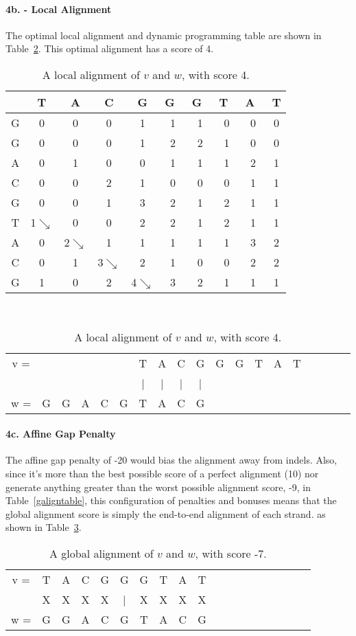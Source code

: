 \documentclass[12pt]{amsart}
\begin{document}
\paragraph{4b. - Local Alignment} The optimal local alignment and dynamic programming table are shown in Table~\ref{laligntable}.  This optimal alignment has a score of 4.

\begin{table}[hbt]
\begin{tabular}{|c|c|c|c|c|c|c|c|c|c|}\hline
   & T & A & C & G & G & G & T & A & T \\ \hline
G &0&0&0&1&1&1&0&0&0\\ \hline
G &0&0&0&1&2&2&1&0&0\\ \hline
A &0&1&0&0&1&1&1&2&1\\ \hline
C &0&0&2&1&0&0&0&1&1\\ \hline
G &0&0&1&3&2&1&2&1&1\\ \hline
T &1$\searrow$&0&0&2&2&1&2&1&1\\ \hline
A &0&2$\searrow$&1&1&1&1&1&3&2\\ \hline
C &0&1&3$\searrow$&2&1&0&0&2&2\\ \hline
G &1&0&2&4$\searrow$&3&2&1&1&1\\ \hline
\end{tabular}\\
\begin{tabular}{ccccccccccccccccccc}
v = &&&&&&T&A&C&G&G&G&T&A&T\\
&&&&&&|&|&|&|&&&&&&&\\
w = &G&G&A&C&G&T&A&C&G&&&&&\\
\end{tabular}
\caption{A local alignment of $v$ and $w$, with score 4.}
\label{laligntable}
\end{table}


\paragraph{4c. Affine Gap Penalty}The affine gap penalty of -20 would bias the alignment away from indels.  Also, since it's more than the best possible score of a perfect alignment (10) nor generate anything greater than the worst possible alignment score, -9, in Table~\ref{galigntable}, this configuration of penalties and bonuses means that the global alignment score is simply the end-to-end alignment of each strand. as shown  in Table~\ref{galign20}.
\begin{table}[htb]
\begin{tabular}{ccccccccccccccccccc}
v = &T&A&C&G&G&G&T&A&T\\
     &X&X&X&X&|&X&X&X&X\\
w = &G&G&A&C&G&T&A&C&G\\
\end{tabular}
\caption{A global alignment of $v$ and $w$, with score -7.}
\label{galign20}
\end{table}
\end{document}
